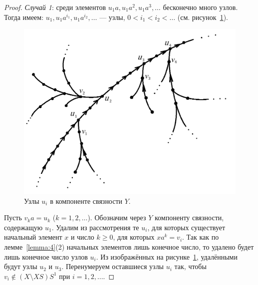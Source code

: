 \documentclass[11pt,twoside,final
]{article}
\begin{document}
\begin{proof}
	\textit{Случай 1}: среди элементов $u_{1}a,u_{1}a^{2},u_{1}a^{3},\ldots$ бесконечно много узлов.
	Тогда имеем: $u_{1},u_{1}a^{i_{1}},u_{1}a^{i_{2}},\ldots$ — узлы, $0 < i_{1} < i_{2} < \ldots$ (см. рисунок~\ref{fig:uzly_2}).
	\begin{figure}[ht!]
		\centering
		\includegraphics[scale=0.8]{img/uzly_2.png}
		\caption{Узлы $u_i$ в компоненте связности $Y$.}
		\label{fig:uzly_2}
	\end{figure}
	
	Пусть $v_k a = u_k$ ($k = 1,2,\ldots$).
	Обозначим через $Y$ компоненту связности, содержащую $u_{1}$.
	Удалим из рассмотрения те $u_{i}$, для которых существует начальный элемент $x$ и число $k \geqslant 0$, для которых $x a^{k} = v_i$.
	Так как по лемме~\ref{lemma:4}(2) начальных элементов лишь конечное число, то удалено будет лишь конечное число узлов $u_{i}$.
	Из изображённых на рисунке~\ref{fig:uzly_2}, удалёнными будут узлы $u_2$ и $u_3$.
	Перенумеруем оставшиеся узлы $u_i$ так, чтобы $v_i \notin (X \setminus XS)S^{1}$ при $i = 1,2,\ldots$.
	

\end{proof}
\end{document}
